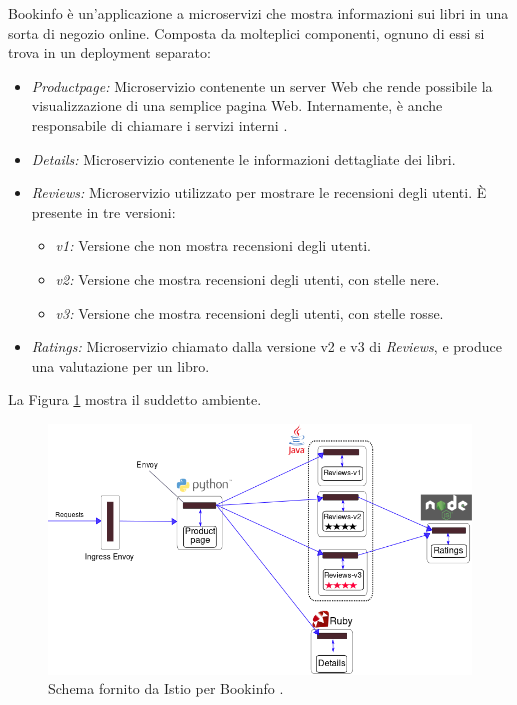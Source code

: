 Bookinfo è un'applicazione a microservizi che mostra informazioni sui libri in una sorta di negozio online. Composta da molteplici componenti, ognuno di essi si trova in un deployment separato:
\begin{itemize}
    \item \textit{Productpage:} Microservizio contenente un server Web che rende possibile la visualizzazione di una semplice pagina Web. Internamente, è anche responsabile di chiamare i servizi interni .
    \item \textit{Details:} Microservizio contenente le informazioni dettagliate dei libri.
    \item \textit{Reviews:} Microservizio utilizzato per mostrare le recensioni degli utenti. È presente in tre versioni:
    \begin{itemize}
        \item \textit{v1:} Versione che non mostra recensioni degli utenti.
        \item \textit{v2:} Versione che mostra recensioni degli utenti, con stelle nere.
        \item \textit{v3:} Versione che mostra recensioni degli utenti, con stelle rosse.
    \end{itemize}
    \item \textit{Ratings:} Microservizio chiamato dalla versione v2 e v3 di \textit{Reviews}, e produce una valutazione per un libro.
\end{itemize}

La Figura \ref{fig:with_istio} mostra il suddetto ambiente.

\begin{figure}[h]
    \centering
    \includegraphics[width=\textwidth]{immagini/capitolo5/withistio.png}
    \caption{Schema fornito da Istio per Bookinfo \cite{istio_bookinfo}.}
    \label{fig:with_istio}
\end{figure}

